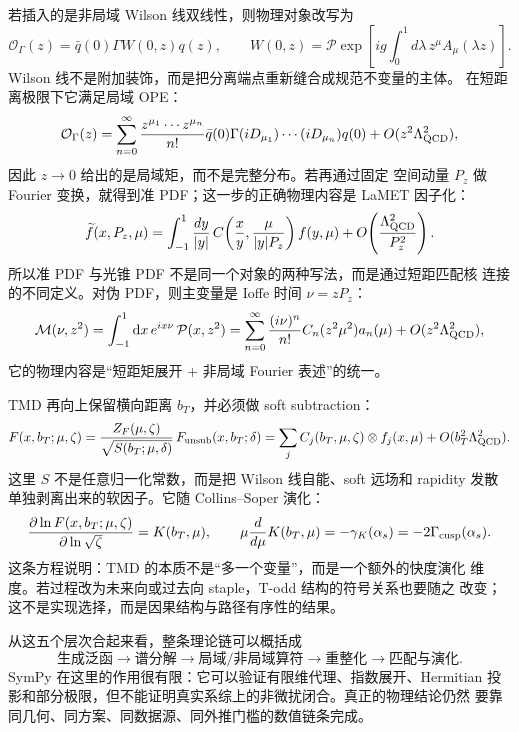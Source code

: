 \documentclass[UTF8,11pt,oneside]{ctexbook}
\newcommand{\dd}{\mathrm{d}}
\begin{document}
若插入的是非局域 Wilson 线双线性，则物理对象改写为
\begin{equation}
 \mathcal O_\Gamma(z)=\bar q(0)\Gamma W(0,z)q(z),\qquad
 W(0,z)=\mathcal P\exp\!\left[ig\int_0^1\!d\lambda\,z^\mu A_\mu(\lambda z)\right].
\end{equation}
Wilson 线不是附加装饰，而是把分离端点重新缝合成规范不变量的主体。
在短距离极限下它满足局域 OPE：
\begin{equation}
 \mathcal O_\Gamma(z)
 =\sum_{n=0}^{\infty}\frac{z^{\mu_1}\cdots z^{\mu_n}}{n!}
 \bar q(0)\Gamma (iD_{\mu_1})\cdots(iD_{\mu_n})q(0)
 +O(z^2\Lambda_{\rm QCD}^2),
\end{equation}
因此 \(z\to0\) 给出的是局域矩，而不是完整分布。若再通过固定
空间动量 \(P_z\) 做 Fourier 变换，就得到准 PDF；这一步的正确物理内容是
LaMET 因子化：
\begin{equation}
 \widetilde f(x,P_z,\mu)
 =\int_{-1}^{1}\frac{dy}{|y|}\,
 C\!\left(\frac{x}{y},\frac{\mu}{|y|P_z}\right)f(y,\mu)
 +O\!\left(\frac{\Lambda_{\rm QCD}^2}{P_z^2}\right).
\end{equation}
所以准 PDF 与光锥 PDF 不是同一个对象的两种写法，而是通过短距匹配核
连接的不同定义。对伪 PDF，则主变量是 Ioffe 时间 \(\nu=zP_z\)：
\begin{equation}
 \mathcal M(\nu,z^2)=\int_{-1}^{1}\dd x\,e^{ix\nu}\,\mathcal P(x,z^2)
 =\sum_{n=0}^{\infty}\frac{(i\nu)^n}{n!}C_n(z^2\mu^2)a_n(\mu)+O(z^2\Lambda_{\rm QCD}^2),
\end{equation}
它的物理内容是“短距矩展开 + 非局域 Fourier 表述”的统一。

TMD 再向上保留横向距离 \(b_T\)，并必须做 soft subtraction：
\begin{equation}
 F(x,b_T;\mu,\zeta)
 =\frac{Z_F(\mu,\zeta)}{\sqrt{S(b_T;\mu,\delta)}}\,F_{\rm unsub}(x,b_T;\delta)
 =\sum_j C_j(b_T,\mu,\zeta)\otimes f_j(x,\mu)
 +O(b_T^2\Lambda_{\rm QCD}^2).
\end{equation}
这里 \(S\) 不是任意归一化常数，而是把 Wilson 线自能、soft 远场和
rapidity 发散单独剥离出来的软因子。它随 Collins--Soper 演化：
\begin{equation}
 \frac{\partial\ln F(x,b_T;\mu,\zeta)}{\partial\ln\sqrt{\zeta}}=K(b_T,\mu),
 \qquad
 \mu\frac{d}{d\mu}K(b_T,\mu)=-\gamma_K(\alpha_s)
 =-2\Gamma_{\rm cusp}(\alpha_s).
\end{equation}
这条方程说明：TMD 的本质不是“多一个变量”，而是一个额外的快度演化
维度。若过程改为未来向或过去向 staple，T-odd 结构的符号关系也要随之
改变；这不是实现选择，而是因果结构与路径有序性的结果。

从这五个层次合起来看，整条理论链可以概括成
\[
 \text{生成泛函}\to\text{谱分解}\to\text{局域/非局域算符}\to
 \text{重整化}\to\text{匹配与演化}.
\]
SymPy 在这里的作用很有限：它可以验证有限维代理、指数展开、Hermitian
投影和部分极限，但不能证明真实系综上的非微扰闭合。真正的物理结论仍然
要靠同几何、同方案、同数据源、同外推门槛的数值链条完成。
\end{document}
